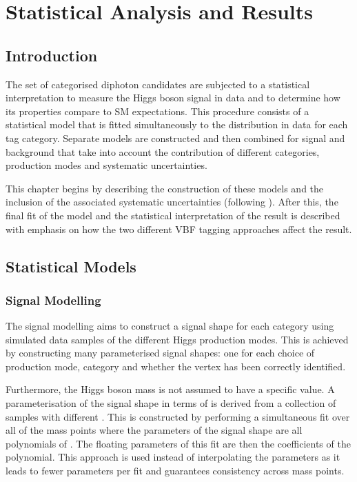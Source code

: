 
\chapter{Statistical Analysis and Results}
\label{chap:statistical}


\section{Introduction}
The set of categorised diphoton candidates are subjected to a statistical interpretation to measure the Higgs boson signal in data and to determine how its properties compare to SM expectations.
This procedure consists of a statistical model that is fitted simultaneously to the \mgg distribution in data for each tag category. 
Separate models are constructed and then combined for signal and background that take into account the contribution of different categories, production modes and systematic uncertainties.

This chapter begins by describing the construction of these models and the inclusion of the associated systematic uncertainties (following \cite{HIG-16-040}). 
After this, the final fit of the model and the statistical interpretation of the result is described with emphasis on how the two different VBF tagging approaches affect the result. 


\section{Statistical Models}
\subsection{Signal Modelling}
The signal modelling aims to construct a signal shape for each category using simulated data samples of the different Higgs production modes.
This is achieved by constructing many parameterised signal shapes: one for each choice of production mode, category and whether the vertex has been correctly identified. 

Furthermore, the Higgs boson mass \mH is not assumed to have a specific value. A parameterisation of the signal shape in terms of \mH is derived from a collection of samples with different \mH.
This is constructed by performing a simultaneous fit over all of the mass points where the parameters of the signal shape are all polynomials of \mH. 
The floating parameters of this fit are then the coefficients of the polynomial. 
This approach is used instead of interpolating the parameters as it leads to fewer parameters per fit and guarantees consistency across mass points. 

